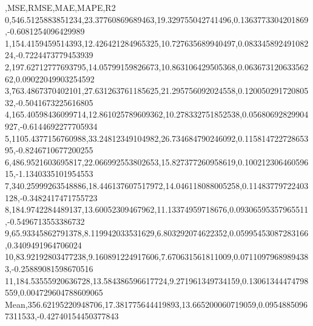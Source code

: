 ,MSE,RMSE,MAE,MAPE,R2
0,546.5125883851234,23.37760869689463,19.329755042741496,0.1363773304201869,-0.6081254096429989
1,154.4159459514393,12.426421284965325,10.727635689940497,0.08334589249108224,-0.7224473779453939
2,197.62712777693795,14.05799159826673,10.863106429505368,0.06367312063356262,0.09022049903254592
3,763.4867370402101,27.631263761185625,21.295756092024558,0.12005029172080532,-0.5041673225616805
4,165.40598436099714,12.861025789609362,10.278332751852538,0.05680692829904927,-0.6144692277705934
5,1105.4377156760988,33.24812349104982,26.734684790246092,0.11581472272865395,-0.8246710677200255
6,486.9521603695817,22.066992553802653,15.827377260958619,0.10021230646059615,-1.1340335101954553
7,340.25999263548886,18.446137607517972,14.046118088005258,0.11483779722403128,-0.3482417471755723
8,184.9742284489137,13.60052309467962,11.13374959718676,0.09306595357965511,-0.5496713553386732
9,65.93345862791378,8.119942033531629,6.803292074622352,0.05995453087283166,0.3409491964706024
10,83.92192803477238,9.160891224917606,7.670631561811009,0.07110979689894383,-0.25889081598670516
11,184.53555920636728,13.584386596617724,9.271961349734159,0.13061344474798559,0.004729604788609065
Mean,356.62195220948706,17.381775644419893,13.665200060719059,0.09548850967311533,-0.42740154450377843
